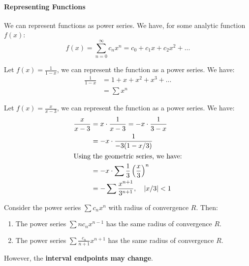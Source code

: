 \documentclass[11pt]{article}
\begin{document}
\paragraph{Representing Functions} We can represent functions as power series. We have, for some analytic function $f(x)$:
\begin{equation}
    f(x) = \sum_{n=0}^{\infty} c_n x^n = c_0 + c_1x + c_2x^2 + \ldots 
\end{equation}
\begin{example}
    Let $f(x) = \frac{1}{1-x}$, we can represent the function as a power series. We have:
    \begin{align*}
        \frac{1}{1-x} &= 1 + x + x^2 + x^3 + \ldots \\
        &= \sum x^n
    \end{align*}
\end{example}
\begin{example}
    Let $f(x) = \frac{x}{x-3}$, we can represent the function as a power series. We have:
    \begin{align*}
        \frac{x}{x-3} &= x \cdot \frac{1}{x-3} = -x \cdot \frac{1}{3-x} \\
        &= -x \cdot \frac{1}{-3(1-x/3)} \\
        \intertext{Using the geometric series, we have:}
        &= -x \cdot \sum \frac{1}{3} \left( \frac{x}{3} \right)^n \\
        &= -\sum \frac{x^{n+1}}{3^{n+1}},\quad |x/3| < 1
    \end{align*}
\end{example}
\begin{theorem}
    Consider the power series $\sum c_n x^n$ with radius of convergence $R$. Then:
    \begin{enumerate}
        \item The power series $\sum n c_n x^{n-1}$ has the same radius of convergence $R$.
        \item The power series $\sum \frac{c_n}{n+1} x^{n+1}$ has the same radius of convergence $R$.
    \end{enumerate}
    However, the \textbf{interval endpoints may change}.
\end{theorem}
\end{document}

